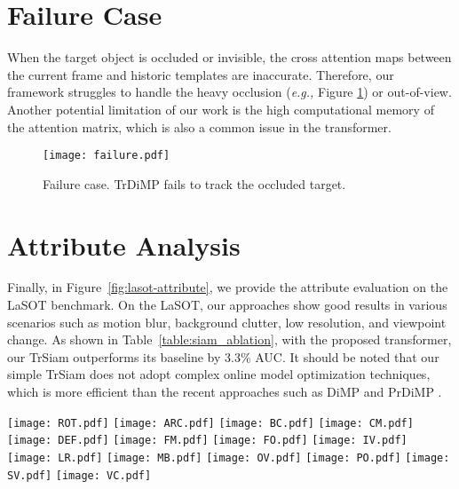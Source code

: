 \documentclass[10pt,twocolumn,letterpaper]{article}
\begin{document}
\section{Failure Case}


When the target object is occluded or invisible, the cross attention maps between the current frame and historic templates are inaccurate. Therefore, our framework struggles to handle the heavy occlusion (\emph{e.g.,} Figure \ref{fig:failure}) or out-of-view. 
Another potential limitation of our work is the high computational memory of the attention matrix, which is also a common issue in the transformer.



{\makeatletter{}\makeatother
	\begin{figure}[h]
		\centering
		\texttt{[image: failure.pdf]}
		\caption{Failure case. TrDiMP fails to track the occluded {target}.}
		\label{fig:failure} 
	\end{figure}
\vspace{-0.1in}
}




\section{Attribute Analysis}

Finally, in Figure~\ref{fig:lasot-attribute}, we provide the attribute evaluation on the LaSOT \cite{LaSOT} benchmark.
On the LaSOT, our approaches show good results in various scenarios such as motion blur, background clutter, low resolution, and viewpoint change.
As shown in Table~\ref{table:siam_ablation}, with the proposed transformer, our TrSiam outperforms its baseline by  3.3\% AUC.
It should be noted that our simple TrSiam does not adopt complex online model optimization techniques, which is more efficient than the recent approaches such as DiMP \cite{DiMP} and PrDiMP \cite{PrDiMP}.



\begin{figure*}
	\centering
	\texttt{[image: ROT.pdf]}
	\texttt{[image: ARC.pdf]}
	\texttt{[image: BC.pdf]}
	\texttt{[image: CM.pdf]}
	\texttt{[image: DEF.pdf]}
	\texttt{[image: FM.pdf]}
	\texttt{[image: FO.pdf]}
	\texttt{[image: IV.pdf]}
	\texttt{[image: LR.pdf]}
	\texttt{[image: MB.pdf]}
	\texttt{[image: OV.pdf]}
	\texttt{[image: PO.pdf]}
	\texttt{[image: SV.pdf]}
	\texttt{[image: VC.pdf]}
	\caption{Attribute-based evaluation on the LaSOT benchmark \cite{LaSOT}. The legend shows the AUC scores of the success plots.}
	\label{fig:lasot-attribute} \end{figure*}
\end{document}

